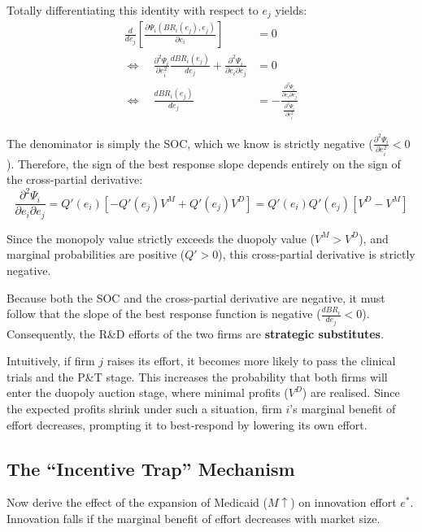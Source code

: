 \documentclass[12pt]{article}
\begin{document}
Totally differentiating this identity with respect to $e_j$ yields:
\begin{align}
    \frac{d}{d e_j}\left[\frac{\partial \Psi_i(BR_i(e_j),e_j)}{\partial e_i}\right] &= 0 \\[0.5em]
    \Longleftrightarrow \quad
    \frac{\partial^2 \Psi_i}{\partial e_i^2}\frac{d BR_i(e_j)}{d e_j}
    +
    \frac{\partial^2 \Psi_i}{\partial e_i \partial e_j} &= 0 \\[0.5em]
    \Longleftrightarrow \quad
    \frac{d BR_i(e_j)}{d e_j}
    &=
    -
    \frac{\frac{\partial^2 \Psi_i}{\partial e_i \partial e_j}}
    {\frac{\partial^2 \Psi_i}{\partial e_i^2}}
\end{align}

The denominator is simply the SOC, which we know is strictly negative ($\frac{\partial^2 \Psi_i}{\partial e_i^2} < 0$). Therefore, the sign of the best response slope depends entirely on the sign of the cross-partial derivative:
\begin{equation}
    \frac{\partial^2 \Psi_i}{\partial e_i \partial e_j} = Q'(e_i) \left[ -Q'(e_j) V^M + Q'(e_j) V^D \right] = Q'(e_i) Q'(e_j) [V^D - V^M]
\end{equation}

Since the monopoly value strictly exceeds the duopoly value ($V^M > V^D$), and marginal probabilities are positive ($Q' > 0$), this cross-partial derivative is strictly negative. 

Because both the SOC and the cross-partial derivative are negative, it must follow that the slope of the best response function is negative ($\frac{d BR_i}{d e_j} < 0$). Consequently, the R\&D efforts of the two firms are \textbf{strategic substitutes}. 

Intuitively, if firm $j$ raises its effort, it becomes more likely to pass the clinical trials and the P\&T stage. This increases the probability that both firms will enter the duopoly auction stage, where minimal profits ($V^D$) are realised. Since the expected profits shrink under such a situation, firm $i$'s marginal benefit of effort decreases, prompting it to best-respond by lowering its own effort.

\subsection{The ``Incentive Trap'' Mechanism}
Now derive the effect of the expansion of Medicaid ($M \uparrow$) on innovation effort $e^*$. Innovation falls if the marginal benefit of effort decreases with market size.
\end{document}
